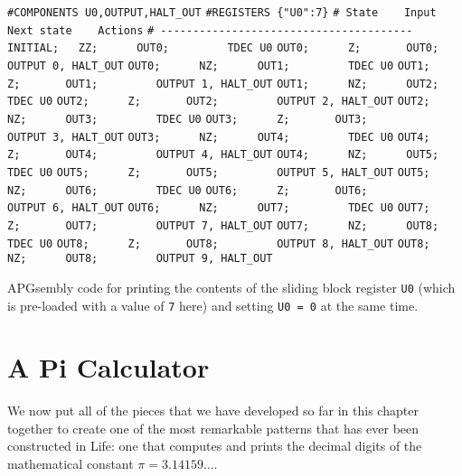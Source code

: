 \begin{apgsembly}
	\begin{algorithmic}\small
		\State \verb|#COMPONENTS U0,OUTPUT,HALT_OUT|
		\State \verb|#REGISTERS {"U0":7}|
		\State \verb|# State    Input    Next state    Actions|
		\State \verb|# ---------------------------------------|
		\State \verb|INITIAL;   ZZ;      OUT0;         TDEC U0|
		\State \verb|OUT0;      Z;       OUT0;         OUTPUT 0, HALT_OUT|
		\State \verb|OUT0;      NZ;      OUT1;         TDEC U0|
		\State \verb|OUT1;      Z;       OUT1;         OUTPUT 1, HALT_OUT|
		\State \verb|OUT1;      NZ;      OUT2;         TDEC U0|
		\State \verb|OUT2;      Z;       OUT2;         OUTPUT 2, HALT_OUT|
		\State \verb|OUT2;      NZ;      OUT3;         TDEC U0|
		\State \verb|OUT3;      Z;       OUT3;         OUTPUT 3, HALT_OUT|
		\State \verb|OUT3;      NZ;      OUT4;         TDEC U0|
		\State \verb|OUT4;      Z;       OUT4;         OUTPUT 4, HALT_OUT|
		\State \verb|OUT4;      NZ;      OUT5;         TDEC U0|
		\State \verb|OUT5;      Z;       OUT5;         OUTPUT 5, HALT_OUT|
		\State \verb|OUT5;      NZ;      OUT6;         TDEC U0|
		\State \verb|OUT6;      Z;       OUT6;         OUTPUT 6, HALT_OUT|
		\State \verb|OUT6;      NZ;      OUT7;         TDEC U0|
		\State \verb|OUT7;      Z;       OUT7;         OUTPUT 7, HALT_OUT|
		\State \verb|OUT7;      NZ;      OUT8;         TDEC U0|
		\State \verb|OUT8;      Z;       OUT8;         OUTPUT 8, HALT_OUT|
		\State \verb|OUT8;      NZ;      OUT8;         OUTPUT 9, HALT_OUT|
	\end{algorithmic}
	\caption{APGsembly code for printing the contents of the sliding block register \texttt{U0} (which is pre-loaded with a value of \texttt{7} here) and setting \texttt{U0 = 0} at the same time.}\label{alg:apgsembly_print_sbr}
\end{apgsembly}



\section{A Pi Calculator}\label{sec:pi_calc}

We now put all of the pieces that we have developed so far in this chapter together to create one of the most remarkable patterns that has ever been constructed in Life: one that computes and prints the decimal digits of the mathematical constant $\pi = 3.14159\ldots$.

